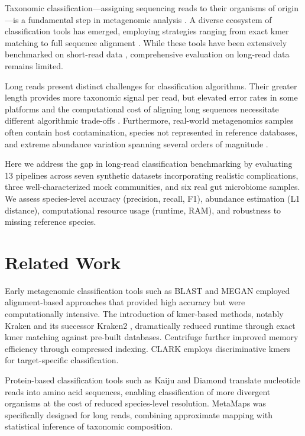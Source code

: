 \documentclass[11pt]{article}
\begin{document}
Taxonomic classification---assigning sequencing reads to their organisms of origin---is a fundamental step in metagenomic analysis \citep{breitwieser2019review}. A diverse ecosystem of classification tools has emerged, employing strategies ranging from exact kmer matching to full sequence alignment \citep{wood2019improved, kim2016centrifuge, li2018minimap2}. While these tools have been extensively benchmarked on short-read data \citep{sun2021challenges, meyer2022critical}, comprehensive evaluation on long-read data remains limited.

Long reads present distinct challenges for classification algorithms. Their greater length provides more taxonomic signal per read, but elevated error rates in some platforms and the computational cost of aligning long sequences necessitate different algorithmic trade-offs \citep{rang2018squiggle}. Furthermore, real-world metagenomics samples often contain host contamination, species not represented in reference databases, and extreme abundance variation spanning several orders of magnitude \citep{sczyrba2017critical}.

Here we address the gap in long-read classification benchmarking by evaluating 13 pipelines across seven synthetic datasets incorporating realistic complications, three well-characterized mock communities, and six real gut microbiome samples. We assess species-level accuracy (precision, recall, F1), abundance estimation (L1 distance), computational resource usage (runtime, RAM), and robustness to missing reference species.

\section{Related Work}

Early metagenomic classification tools such as BLAST \citep{altschul1990basic} and MEGAN \citep{huson2007megan} employed alignment-based approaches that provided high accuracy but were computationally intensive. The introduction of kmer-based methods, notably Kraken \citep{wood2014kraken} and its successor Kraken2 \citep{wood2019improved}, dramatically reduced runtime through exact kmer matching against pre-built databases. Centrifuge \citep{kim2016centrifuge} further improved memory efficiency through compressed indexing. CLARK \citep{ounit2015clark} employs discriminative kmers for target-specific classification.

Protein-based classification tools such as Kaiju \citep{menzel2016fast} and Diamond \citep{buchfink2015fast} translate nucleotide reads into amino acid sequences, enabling classification of more divergent organisms at the cost of reduced species-level resolution. MetaMaps \citep{dilthey2019strain} was specifically designed for long reads, combining approximate mapping with statistical inference of taxonomic composition.
\end{document}
